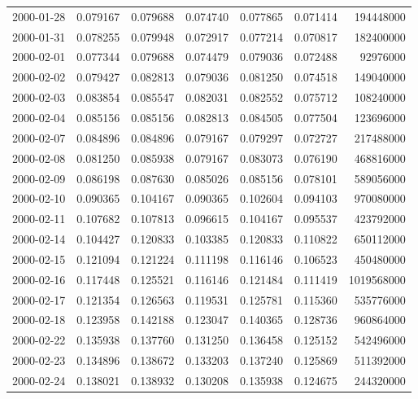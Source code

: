 \begin{tabular}{lrrrrrr}
2000-01-28 &    0.079167 &    0.079688 &    0.074740 &    0.077865 &    0.071414 &   194448000 \\
2000-01-31 &    0.078255 &    0.079948 &    0.072917 &    0.077214 &    0.070817 &   182400000 \\
2000-02-01 &    0.077344 &    0.079688 &    0.074479 &    0.079036 &    0.072488 &    92976000 \\
2000-02-02 &    0.079427 &    0.082813 &    0.079036 &    0.081250 &    0.074518 &   149040000 \\
2000-02-03 &    0.083854 &    0.085547 &    0.082031 &    0.082552 &    0.075712 &   108240000 \\
2000-02-04 &    0.085156 &    0.085156 &    0.082813 &    0.084505 &    0.077504 &   123696000 \\
2000-02-07 &    0.084896 &    0.084896 &    0.079167 &    0.079297 &    0.072727 &   217488000 \\
2000-02-08 &    0.081250 &    0.085938 &    0.079167 &    0.083073 &    0.076190 &   468816000 \\
2000-02-09 &    0.086198 &    0.087630 &    0.085026 &    0.085156 &    0.078101 &   589056000 \\
2000-02-10 &    0.090365 &    0.104167 &    0.090365 &    0.102604 &    0.094103 &   970080000 \\
2000-02-11 &    0.107682 &    0.107813 &    0.096615 &    0.104167 &    0.095537 &   423792000 \\
2000-02-14 &    0.104427 &    0.120833 &    0.103385 &    0.120833 &    0.110822 &   650112000 \\
2000-02-15 &    0.121094 &    0.121224 &    0.111198 &    0.116146 &    0.106523 &   450480000 \\
2000-02-16 &    0.117448 &    0.125521 &    0.116146 &    0.121484 &    0.111419 &  1019568000 \\
2000-02-17 &    0.121354 &    0.126563 &    0.119531 &    0.125781 &    0.115360 &   535776000 \\
2000-02-18 &    0.123958 &    0.142188 &    0.123047 &    0.140365 &    0.128736 &   960864000 \\
2000-02-22 &    0.135938 &    0.137760 &    0.131250 &    0.136458 &    0.125152 &   542496000 \\
2000-02-23 &    0.134896 &    0.138672 &    0.133203 &    0.137240 &    0.125869 &   511392000 \\
2000-02-24 &    0.138021 &    0.138932 &    0.130208 &    0.135938 &    0.124675 &   244320000 \\

\end{tabular}
